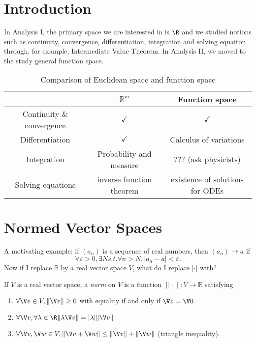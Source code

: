 \documentclass[a4paper]{article}
\theoremstyle{definition}
\begin{document}
\maketitle

\tableofcontents

\setcounter{section}{-1}

\section{Introduction}

In Analysis I, the primary space we are interested in is \(\R\) and we studied notions such as continuity, convergence, differentiation, integration and solving equaiton through, for example, Intermediate Value Theorem. In Analysis II, we moved to the study general function space.

\begin{table}[htbp]
  \centering
  \begin{tabular}{|c|c|c|}
    \hline
    & $\mathbb{R}^m$ & Function space \\ \hline
    Continuity \& convergence & $\checkmark$ & $\checkmark$ \\ \hline
    Differentiation & $\checkmark$ & Calculus of variations \\ \hline
    Integration & Probability and measure & ??? (ask physicists) \\ \hline
    Solving equations & inverse function theorem & existence of solutions for ODEs \\ \hline
  \end{tabular}
  \caption{Comparison of Euclidean space and function space}
\end{table}

\section{Normed Vector Spaces}

A motivating example: if $(a_n)$ is a sequence of real numbers, then $(a_n)\to a$ if
\[
  \forall \varepsilon>0,\exists N s.t. \forall n>N, |a_n-a|<\varepsilon.
\]
Now if I replace $\mathbb{R}$ by a real vector space $V$, what do I replace $|\cdot|$ with?

\begin{defi}
  If $V$ is a real vector space, a \emph{norm} on $V$ is a function $\|\cdot\|:V\to\mathbb{R}$ satisfying
  \begin{enumerate}
  \item $\forall \V v \in V, \|\V v\| \geq 0$ with equality if and only if $\V v =\V 0$.
  \item $\forall \V v,\forall \lambda \in \R \|\lambda \V v\| = |\lambda| \|\V v\|$
    \item $\forall \V v,\V w\in V, \|\V v+\V w\| \leq \|\V v\| + \|\V w\|$ (triangle inequality).
  \end{enumerate}
\end{defi}
\end{document}
